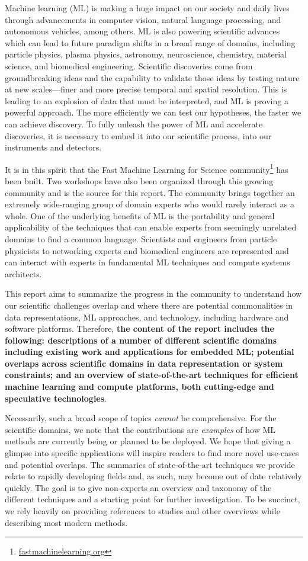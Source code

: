 Machine learning (ML) is making a huge impact on our society and daily lives through advancements in computer vision, natural language processing, and autonomous vehicles, among others.  
ML is also powering scientific advances which can lead to future paradigm shifts in a broad range of domains, including particle physics, plasma physics, astronomy, neuroscience, chemistry, material science, and biomedical engineering.  
Scientific discoveries come from groundbreaking ideas and the capability to validate those ideas by testing nature at new scales---finer and more precise temporal and spatial resolution.  
This is leading to an explosion of data that must be interpreted, and ML is proving a powerful approach. 
The more efficiently we can test our hypotheses, the faster we can achieve discovery.  
To fully unleash the power of ML and accelerate discoveries, it is necessary to embed it into our scientific process, into our instruments and detectors.

It is in this spirit that the Fast Machine Learning for Science community\footnote{\url{fastmachinelearning.org}} has been built.  
Two workshops have also been organized through this growing community and is the source for this report.  
The community brings together an extremely wide-ranging group of domain experts who would rarely interact as a whole. 
One of the underlying benefits of ML is the portability and general applicability of the techniques that can enable experts from seemingly unrelated domains to find a common language. 
Scientists and engineers from particle physicists to networking experts and biomedical engineers are represented and can interact with experts in fundamental ML techniques and compute systems architects.  

This report aims to summarize the progress in the community to understand how our scientific challenges overlap and where there are potential commonalities in data representations, ML approaches, and technology, including hardware and software platforms. 
Therefore, \textbf{the content of the report includes the following: descriptions of a number of different scientific domains including existing work and applications for embedded ML; potential overlaps across scientific domains in data representation or system constraints; and an overview of state-of-the-art techniques for efficient machine learning and compute platforms, both cutting-edge and speculative technologies}.  

Necessarily, such a broad scope of topics \textit{cannot} be comprehensive. 
For the scientific domains, we note that the contributions are \textit{examples} of how ML methods are currently being or planned to be deployed.  
We hope that giving a glimpse into specific applications will inspire readers to find more novel use-cases and potential overlaps. 
The summaries of state-of-the-art techniques we provide relate to rapidly developing fields and, as such, may become out of date relatively quickly.  
The goal is to give non-experts an overview and taxonomy of the different techniques and a starting point for further investigation.
To be succinct, we rely heavily on providing references to studies and other overviews while describing most modern methods.

